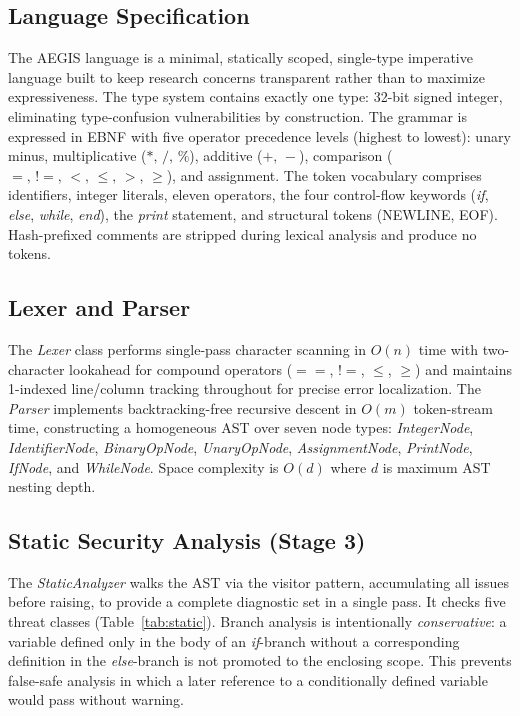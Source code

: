 \documentclass[conference]{IEEEtran}
\begin{document}
\subsection{Language Specification}

The AEGIS language is a minimal, statically scoped, single-type
imperative language built to keep research concerns transparent
rather than to maximize expressiveness. The type system contains exactly one type:
32-bit signed integer, eliminating type-confusion
vulnerabilities by construction. The grammar is expressed in EBNF
with five operator precedence levels (highest to lowest):
unary minus, multiplicative ($*,\,/,\,\%$), additive ($+,\,-$),
comparison ($\!=\!,\,!=\!,\,<,\,\leq,\,>,\,\geq$), and assignment.
The token vocabulary comprises identifiers, integer literals, eleven
operators, the four control-flow keywords (\textit{if},
\textit{else}, \textit{while}, \textit{end}), the \textit{print}
statement, and structural tokens (NEWLINE, EOF).
Hash-prefixed comments are stripped during lexical analysis and
produce no tokens.

\subsection{Lexer and Parser}

The \textit{Lexer} class performs single-pass character scanning in
$O(n)$ time with two-character lookahead for compound operators
($=\!=$, $!=$, $\leq$, $\geq$) and maintains 1-indexed
line/column tracking throughout for precise error localization.
The \textit{Parser} implements backtracking-free recursive descent
in $O(m)$ token-stream time, constructing a homogeneous AST over
seven node types: \textit{IntegerNode}, \textit{IdentifierNode},
\textit{BinaryOpNode}, \textit{UnaryOpNode},
\textit{AssignmentNode}, \textit{PrintNode}, \textit{IfNode}, and
\textit{WhileNode}. Space complexity is $O(d)$ where $d$ is maximum
AST nesting depth.

\subsection{Static Security Analysis (Stage 3)}

The \textit{StaticAnalyzer} walks the AST via the visitor pattern,
accumulating all issues before raising, to provide a complete
diagnostic set in a single pass. It checks five threat classes
(Table~\ref{tab:static}). Branch analysis is intentionally
\emph{conservative}: a variable defined only in the body of an
\textit{if}-branch without a corresponding definition in the
\textit{else}-branch is not promoted to the enclosing scope. This
prevents false-safe analysis in which a later reference to a
conditionally defined variable would pass without warning.
\end{document}
